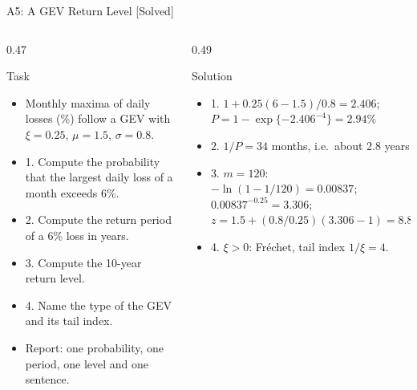 \begin{frame}{A5: A GEV Return Level [Solved]}
\itemsize{\scriptsize}
\begin{columns}[T]
\begin{column}{0.47\textwidth}
\begin{block}{Task}
\begin{itemize}
    \item Monthly maxima of daily losses (\%) follow a GEV with $\xi = 0.25$, $\mu = 1.5$, $\sigma = 0.8$.
    \item 1. Compute the probability that the largest daily loss of a month exceeds 6\%.
    \item 2. Compute the return period of a 6\% loss in years.
    \item 3. Compute the 10-year return level.
    \item 4. Name the type of the GEV and its tail index.
    \item Report: one probability, one period, one level and one sentence.
\end{itemize}
\end{block}
\end{column}
\begin{column}{0.49\textwidth}
\begin{exampleblock}{Solution}
\begin{itemize}
    \item 1. $1 + 0.25(6 - 1.5)/0.8 = 2.406$; $P = 1 - \exp\{-2.406^{-4}\} = 2.94\%$
    \item 2. $1/P = 34$ months, i.e.\ about 2.8 years
    \item 3. $m = 120$: $-\ln(1 - 1/120) = 0.00837$; $0.00837^{-0.25} = 3.306$; $z = 1.5 + (0.8/0.25)(3.306 - 1) = 8.88\%$
    \item 4. $\xi > 0$: Fréchet, tail index $1/\xi = 4$.
\end{itemize}
\end{exampleblock}
\end{column}
\end{columns}
\end{frame}

